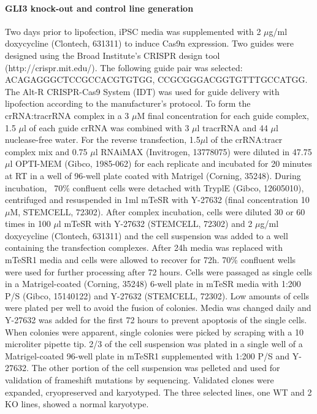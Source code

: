 \paragraph{GLI3 knock-out and control line generation}
Two days prior to lipofection, iPSC media was supplemented with 2 $\mu$g/ml doxycycline (Clontech, 631311) to induce Cas9n expression. Two guides were designed using the Broad Institute's CRISPR design tool (http://crispr.mit.edu/). The following guide pair was selected: ACAGAGGGCTCCGCCACGTGTGG, CCGCGGGACGGTGTTTGCCATGG. The Alt-R CRISPR-Cas9 System (IDT) was used for guide delivery with lipofection according to the manufacturer's protocol. To form the crRNA:tracrRNA complex in a 3 $\mu$M final concentration for each guide complex, 1.5 $\mu$l of each guide crRNA was combined with 3 $\mu$l tracrRNA and 44 $\mu$l nuclease-free water. For the reverse transfection, 1.5$\mu$l of the crRNA:tracr complex mix and  0.75 $\mu$l RNAiMAX (Invitrogen, 13778075) were diluted in 47.75 $\mu$l OPTI-MEM (Gibco, 1985-062) for each replicate and incubated for 20 minutes at RT in a well of 96-well plate coated with Matrigel (Corning, 35248). During incubation, ~70\% confluent cells were detached with TryplE (Gibco, 12605010), centrifuged and resuspended in 1ml mTeSR with Y-27632 (final concentration 10$\mu$M, STEMCELL, 72302). After complex incubation, cells were diluted 30 or 60 times in 100 $\mu$l mTeSR with  Y-27632 (STEMCELL, 72302) and 2 $\mu$g/ml doxycycline (Clontech, 631311) and the cell suspension was added to a well containing the transfection complexes. After 24h media was replaced with mTeSR1 media and cells were allowed to recover for 72h. 70\% confluent wells were used for further processing after 72 hours. Cells were passaged as single cells in a Matrigel-coated (Corning, 35248) 6-well plate in mTeSR media with 1:200 P/S (Gibco, 15140122) and Y-27632 (STEMCELL, 72302). Low amounts of cells were plated per well to avoid the fusion of colonies. Media was changed daily and Y-27632 was added for the first 72 hours to prevent apoptosis of the single cells. When colonies were apparent, single colonies were picked by scraping with a 10 microliter pipette tip. 2/3 of the cell suspension was plated in a single well of a Matrigel-coated 96-well plate in mTeSR1 supplemented with 1:200 P/S and Y-27632. The other portion of the cell suspension was pelleted and used for validation of frameshift mutations by sequencing. Validated clones were expanded, cryopreserved and karyotyped. The three selected lines, one WT and 2 KO lines, showed a normal karyotype.
 
